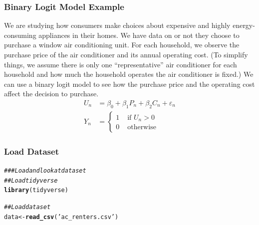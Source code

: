 \documentclass{beamer}\usepackage[]{graphicx}\usepackage[]{color}
\makeatletter
\newcommand{\hlstr}[1]{\textcolor[rgb]{0.192,0.494,0.8}{#1}}%
\newcommand{\hlcom}[1]{\textcolor[rgb]{0.678,0.584,0.686}{\textit{#1}}}%
\newcommand{\hlstd}[1]{\textcolor[rgb]{0.345,0.345,0.345}{#1}}%
\newcommand{\hlkwb}[1]{\textcolor[rgb]{0.69,0.353,0.396}{#1}}%
\newcommand{\hlkwd}[1]{\textcolor[rgb]{0.737,0.353,0.396}{\textbf{#1}}}%
\newenvironment{kframe}{%
 \def\at@end@of@kframe{}%
 \ifinner\ifhmode%
  \def\at@end@of@kframe{\end{minipage}}%
  \begin{minipage}{\columnwidth}%
 \fi\fi%
 \def\FrameCommand##1{\hskip\@totalleftmargin \hskip-\fboxsep
 \colorbox{shadecolor}{##1}\hskip-\fboxsep
     \hskip-\linewidth \hskip-\@totalleftmargin \hskip\columnwidth}%
 \MakeFramed {\advance\hsize-\width
   \@totalleftmargin\z@ \linewidth\hsize
   \@setminipage}}%
 {\par\unskip\endMakeFramed%
 \at@end@of@kframe}
\newenvironment{knitrout}{}{} %
\makeatother
\begin{document}
\begin{frame}\frametitle{Binary Logit Model Example}
    We are studying how consumers make choices about expensive and highly energy-consuming appliances in their homes. We have data on  or not they choose to purchase a window air conditioning unit. For each household, we observe the purchase price of the air conditioner and its annual operating cost. (To simplify things, we assume there is only one ``representative'' air conditioner for each household and how much the household operates the air conditioner is fixed.) We can use a binary logit model to see how the purchase price and the operating cost affect the decision to purchase.
    \begin{align*}
    	U_n &= \beta_0 + \beta_1 P_n + \beta_2 C_n + \varepsilon_n \\
    	Y_n &= 
    		\begin{cases}
    			1 & \text{ if } U_n > 0 \\
    			0 & \text{ otherwise}
    		\end{cases}
    \end{align*}
\end{frame}

\begin{frame}[fragile]\frametitle{Load Dataset}
\begin{knitrout}\footnotesize
{}\color{fgcolor}\begin{kframe}
\begin{alltt}
\hlcom{### Load and look at dataset}
\hlcom{## Load tidyverse}
\hlkwd{library}\hlstd{(tidyverse)}
\end{alltt}
\end{kframe}
\end{knitrout}
\begin{knitrout}\footnotesize
{}\color{fgcolor}\begin{kframe}
\begin{alltt}
\hlcom{## Load dataset}
\hlstd{data} \hlkwb{<-} \hlkwd{read_csv}\hlstd{(}\hlstr{'ac_renters.csv'}\hlstd{)}
\end{alltt}


{\ttfamily\noindent\itshape\color{messagecolor}{\#\# Parsed with column specification:\\\#\# cols(\\\#\#\ \  air\_conditioning = col\_logical(),\\\#\#\ \  cost\_system = col\_double(),\\\#\#\ \  cost\_operating = col\_double(),\\\#\#\ \  income = col\_double(),\\\#\#\ \  residents = col\_double(),\\\#\#\ \  city = col\_double()\\\#\# )}}\end{kframe}
\end{knitrout}
\end{frame}
\end{document}
